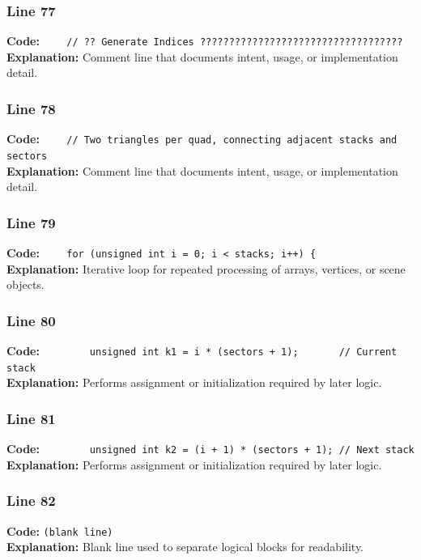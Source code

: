 \documentclass[11pt,a4paper]{article}
\begin{document}
\subsubsection*{Line 77}
\textbf{Code:} \verb|    // ?? Generate Indices ???????????????????????????????????|\\
\textbf{Explanation:} Comment line that documents intent, usage, or implementation detail.

\subsubsection*{Line 78}
\textbf{Code:} \verb|    // Two triangles per quad, connecting adjacent stacks and sectors|\\
\textbf{Explanation:} Comment line that documents intent, usage, or implementation detail.

\subsubsection*{Line 79}
\textbf{Code:} \verb|    for (unsigned int i = 0; i < stacks; i++) {|\\
\textbf{Explanation:} Iterative loop for repeated processing of arrays, vertices, or scene objects.

\subsubsection*{Line 80}
\textbf{Code:} \verb|        unsigned int k1 = i * (sectors + 1);       // Current stack|\\
\textbf{Explanation:} Performs assignment or initialization required by later logic.

\subsubsection*{Line 81}
\textbf{Code:} \verb|        unsigned int k2 = (i + 1) * (sectors + 1); // Next stack|\\
\textbf{Explanation:} Performs assignment or initialization required by later logic.

\subsubsection*{Line 82}
\textbf{Code:} \texttt{(blank line)}\\
\textbf{Explanation:} Blank line used to separate logical blocks for readability.
\end{document}
